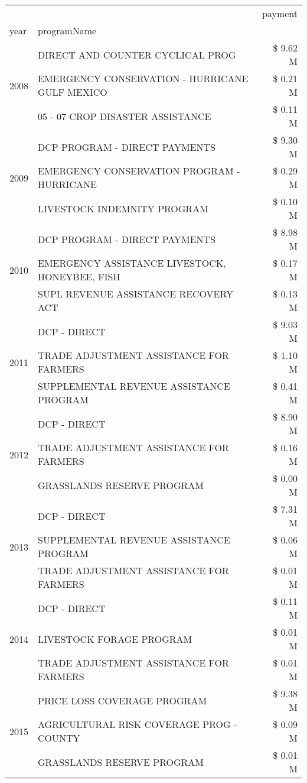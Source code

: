 \begin{tabular}{llr}
\toprule
 &  & payment \\
year & programName &  \\
\midrule
\multirow[t]{3}{*}{2008} & DIRECT AND COUNTER CYCLICAL PROG & \$ 9.62 M \\
 & EMERGENCY CONSERVATION - HURRICANE GULF MEXICO & \$ 0.21 M \\
 & 05 - 07 CROP DISASTER ASSISTANCE & \$ 0.11 M \\
\cline{1-3}
\multirow[t]{3}{*}{2009} & DCP PROGRAM - DIRECT PAYMENTS & \$ 9.30 M \\
 & EMERGENCY CONSERVATION PROGRAM - HURRICANE & \$ 0.29 M \\
 & LIVESTOCK INDEMNITY PROGRAM & \$ 0.10 M \\
\cline{1-3}
\multirow[t]{3}{*}{2010} & DCP PROGRAM - DIRECT PAYMENTS & \$ 8.98 M \\
 & EMERGENCY ASSISTANCE LIVESTOCK, HONEYBEE, FISH & \$ 0.17 M \\
 & SUPL REVENUE ASSISTANCE RECOVERY ACT & \$ 0.13 M \\
\cline{1-3}
\multirow[t]{3}{*}{2011} & DCP - DIRECT & \$ 9.03 M \\
 & TRADE ADJUSTMENT ASSISTANCE FOR FARMERS & \$ 1.10 M \\
 & SUPPLEMENTAL REVENUE ASSISTANCE PROGRAM & \$ 0.41 M \\
\cline{1-3}
\multirow[t]{3}{*}{2012} & DCP - DIRECT & \$ 8.90 M \\
 & TRADE ADJUSTMENT ASSISTANCE FOR FARMERS & \$ 0.16 M \\
 & GRASSLANDS RESERVE PROGRAM & \$ 0.00 M \\
\cline{1-3}
\multirow[t]{3}{*}{2013} & DCP - DIRECT & \$ 7.31 M \\
 & SUPPLEMENTAL REVENUE ASSISTANCE PROGRAM & \$ 0.06 M \\
 & TRADE ADJUSTMENT ASSISTANCE FOR FARMERS & \$ 0.01 M \\
\cline{1-3}
\multirow[t]{3}{*}{2014} & DCP - DIRECT & \$ 0.11 M \\
 & LIVESTOCK FORAGE PROGRAM & \$ 0.01 M \\
 & TRADE ADJUSTMENT ASSISTANCE FOR FARMERS & \$ 0.01 M \\
\cline{1-3}
\multirow[t]{3}{*}{2015} & PRICE LOSS COVERAGE PROGRAM & \$ 9.38 M \\
 & AGRICULTURAL RISK COVERAGE PROG - COUNTY & \$ 0.09 M \\
 & GRASSLANDS RESERVE PROGRAM & \$ 0.01 M \\

\end{tabular}
